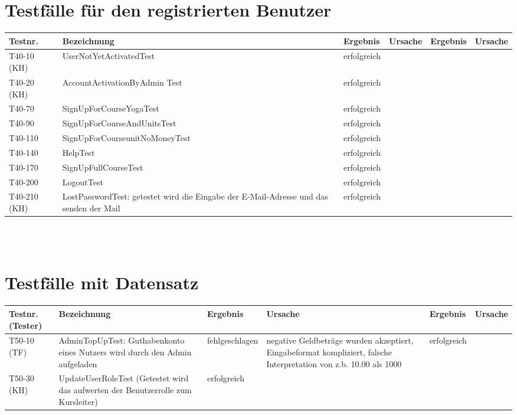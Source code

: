 \begin{landscape}
	\section{Testfälle für den registrierten Benutzer}
		\begin{tabular}{|p{2.0cm} |p{5.0cm}|p{3.0cm}|p{5.0cm}|p{4.0cm}|p{4.0cm}|}
			\hline \textbf{Testnr.} & \textbf{Bezeichnung} & \textbf{Ergebnis} & \textbf{Ursache} & \textbf{Ergebnis} & \textbf{Ursache} \\
			\hline T40-10 (KH)  &  UserNotYetActivatedTest        & erfolgreich   &        &         &       \\
			\hline T40-20  (KH) & AccountActivationByAdmin Test  & erfolgreich    &        &         &       \\	
			\hline T40-70   & SignUpForCourseYogaTest & erfolgreich &        &         &       \\	
			\hline T40-90   & SignUpForCourseAndUnitsTest & erfolgreich &        &         &       \\	
			\hline T40-110  & SignUpForCourseunitNoMoneyTest & erfolgreich &        &         &       \\	
			\hline T40-140  & HelpTest & erfolgreich &        &         &       \\	
			\hline T40-170  & SignUpFullCourseTest & erfolgreich &        &         &       \\	
			\hline T40-200  & LogoutTest & erfolgreich &        &         &       \\
			\hline T40-210 (KH) & LostPasswordTest: getestet wird die Eingabe der E-Mail-Adresse und das senden der Mail & erfolgreich &        &         &       \\
			\hline 
		\end{tabular} \ \\
		\ \\
			
	\section{Testfälle mit Datensatz}	
		\begin{tabular}{|p{2.0cm} |p{5.0cm}|p{3.0cm}|p{5.0cm}|p{4.0cm}|p{4.0cm}|}
			\hline \textbf{Testnr.(Tester)} & \textbf{Bezeichnung} & \textbf{Ergebnis} & \textbf{Ursache} & \textbf{Ergebnis} & \textbf{Ursache} \\
			
			\hline  T50-10 (TF) & AdminTopUpTest: Guthabenkonto eines Nutzers wird durch den Admin aufgeladen &     fehlgeschlagen     & negative Geldbeträge wurden akzeptiert,  Eingabeformat kompliziert, falsche Interpretation von z.b. 10.00 als 1000       &    erfolgreich     &       \\	
			\hline  T50-30 (KH)     &  UpdateUserRoleTest (Getestet wird das aufwerten der Benutzerrolle zum Kursleiter)    &    erfolgreich      &        &         &       \\
			

\end{tabular}
\end{landscape}
